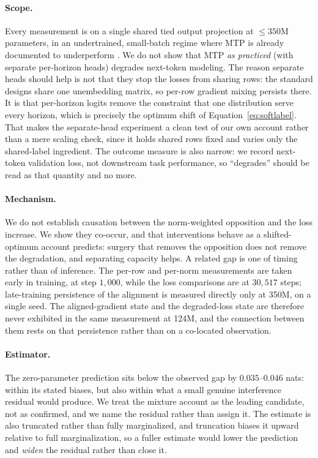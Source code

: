 \paragraph{Scope.} Every measurement is on a single shared tied output projection
at ${\leq}350$M parameters, in an undertrained, small-batch regime where MTP is
already documented to underperform \citep{gloeckle2024mtp,zuhri2025top}. We do not show that MTP
\emph{as practiced} (with separate per-horizon heads) degrades next-token
modeling. The reason separate heads should help is not that they stop the losses
from sharing rows: the standard designs share one unembedding matrix, so per-row
gradient mixing persists there. It is that per-horizon logits remove the
constraint that one distribution serve every horizon, which is precisely the
optimum shift of Equation~\ref{eq:softlabel}. That makes the separate-head
experiment a clean test of our own account rather than a mere scaling check, since
it holds shared rows fixed and varies only the shared-label ingredient. The
outcome measure is also narrow: we record next-token validation loss, not downstream
task performance, so ``degrades'' should be read as that quantity and no more.

\paragraph{Mechanism.} We do not establish causation between the norm-weighted opposition and the loss increase. We show they co-occur, and that interventions behave as a shifted-optimum account predicts: surgery that removes the opposition does not remove the degradation, and separating capacity helps.
A related gap is one of timing rather than of inference. The per-row and per-norm
measurements are taken early in training, at step $1{,}000$, while the loss
comparisons are at $30{,}517$ steps; late-training persistence of the alignment is
measured directly only at 350M, on a single seed. The aligned-gradient state and
the degraded-loss state are therefore never exhibited in the same measurement at
124M, and the connection between them rests on that persistence rather than on a
co-located observation.

\paragraph{Estimator.} The zero-parameter prediction sits below the observed gap
by $0.035$--$0.046$ nats: within its stated biases, but also within what a small
genuine interference residual would produce. We treat the mixture account as the
leading candidate, not as confirmed, and we name the residual rather than assign
it. The estimate is also truncated rather than fully marginalized, and truncation
biases it upward relative to full marginalization, so a fuller estimate would
lower the prediction and \emph{widen} the residual rather than close it.

